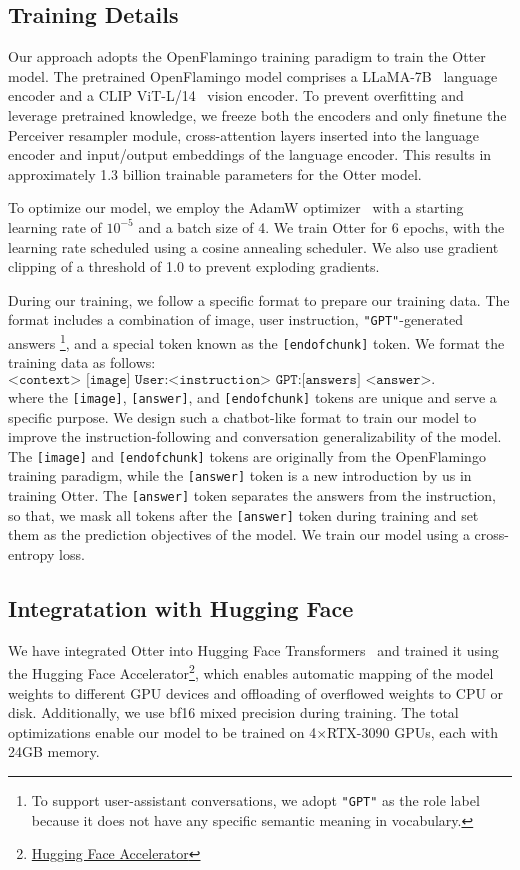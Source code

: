 \documentclass{article}
\begin{document}
\subsection{Training Details}
\label{sec:training}
Our approach adopts the OpenFlamingo training paradigm to train the Otter model. The pretrained OpenFlamingo model comprises a LLaMA-7B~\cite{llama} language encoder and a CLIP ViT-L/14~\cite{clip} vision encoder. To prevent overfitting and leverage pretrained knowledge, we freeze both the encoders and only finetune the Perceiver resampler module, cross-attention layers inserted into the language encoder and input/output embeddings of the language encoder. This results in approximately 1.3 billion trainable parameters for the Otter model.

To optimize our model, we employ the AdamW optimizer~\cite{adamw} with a starting learning rate of $10^{-5}$ and a batch size of 4. We train Otter for 6 epochs, with the learning rate scheduled using a cosine annealing scheduler. We also use gradient clipping of a threshold of 1.0 to prevent exploding gradients. 

During our training, we follow a specific format to prepare our training data. The format includes a combination of image, user instruction, \texttt{"GPT"}-generated answers \footnote{To support user-assistant conversations, we adopt \texttt{"GPT"} as the role label because it does not have any specific semantic meaning in vocabulary.}, and a special token known as the \texttt{[endofchunk]} token. We format the training data as follows:
\[ \texttt{<context> [image] User:<instruction> GPT:[answers] <answer>.[endofchunk]} \]
where the \texttt{[image]}, \texttt{[answer]}, and \texttt{[endofchunk]} tokens are unique and serve a specific purpose. We design such a chatbot-like format to train our model to improve the instruction-following and conversation generalizability of the model. The \texttt{[image]} and \texttt{[endofchunk]} tokens are originally from the OpenFlamingo training paradigm, while the \texttt{[answer]} token is a new introduction by us in training Otter. The \texttt{[answer]} token separates the answers from the instruction, so that, we mask all tokens after the \texttt{[answer]} token during training and set them as the prediction objectives of the model. We train our model using a cross-entropy loss. 

\subsection{Integratation with Hugging Face}
\label{sec:integrate_hf}
We have integrated Otter into Hugging Face Transformers~\cite{transformers} and trained it using the Hugging Face Accelerator\footnote{\href{https://HuggingFace.co/docs/accelerate/index}{Hugging Face Accelerator}}, which enables automatic mapping of the model weights to different GPU devices and offloading of overflowed weights to CPU or disk. Additionally, we use bf16 mixed precision during training. The total optimizations enable our model to be trained on 4$\times$RTX-3090 GPUs, each with 24GB memory.
\end{document}
